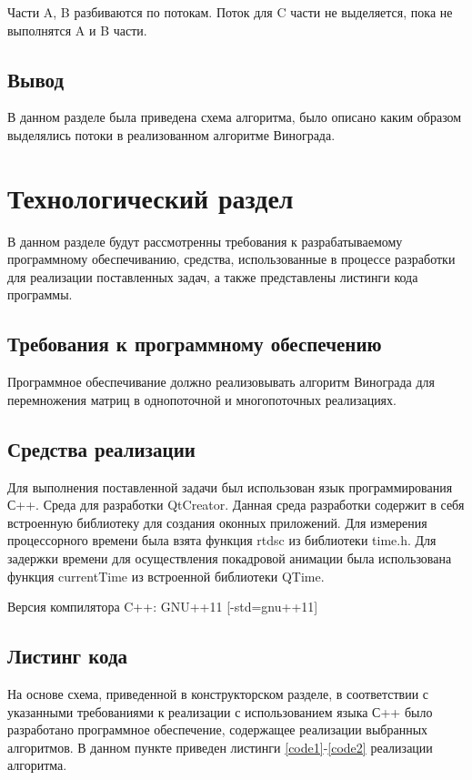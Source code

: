 \documentclass[12pt, a4paper]{report}
\begin{document}
	Части A, B разбиваются по потокам. Поток для C части не выделяется, пока не выполнятся A и B части.

	
	\section{Вывод}
	В данном разделе была приведена схема алгоритма, было описано каким образом выделялись потоки в реализованном алгоритме Винограда.
	
	\newpage
	
	\chapter{Технологический раздел}
	\vspace{-0.5cm}В данном разделе будут рассмотренны требования к разрабатываемому программному обеспечиванию, средства, использованные в процессе разработки для реализации поставленных задач, а также представлены листинги кода программы.
	
	\section{Требования к программному обеспечению}
	Программное обеспечивание должно реализовывать алгоритм Винограда для перемножения матриц в однопоточной и многопоточных реализациях.
	
	\section{Средства реализации}
	\hspace{0.6cm}Для выполнения поставленной задачи был использован язык программирования С++. Среда для разработки QtCreator. Данная среда разработки содержит в себя встроенную библиотеку для создания оконных приложений. Для измерения процессорного времени была взята функция rtdsc из библиотеки time.h. Для задержки времени для осуществления покадровой анимации была использована функция currentTime из встроенной библиотеки QTime.
	
	\vspace{0.2cm}Версия компилятора C++: GNU++11 [-std=gnu++11]
	
	
	\section{Листинг кода}
	\hspace{0.6cm}На основе схема, приведенной в конструкторском разделе, в соответствии с указанными требованиями к реализации с использованием языка С++ было разработано программное обеспечение, содержащее реализации выбранных алгоритмов. В данном пункте приведен листинги \ref{code1}-\ref{code2} реализации алгоритма\cite{prata}.
\end{document}
